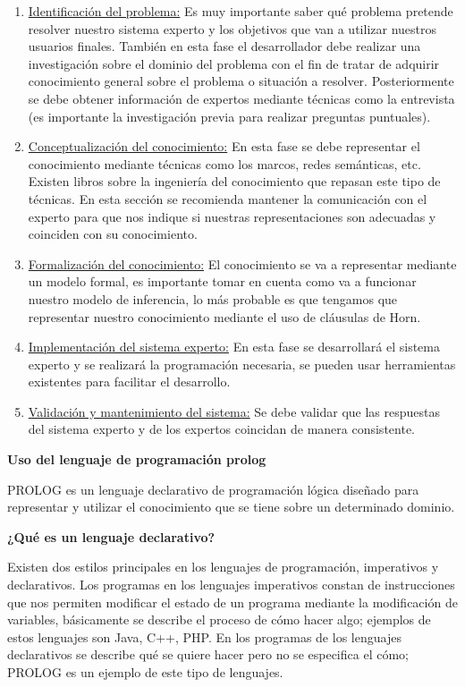 \documentclass[11pt,fleqn]{book} %
\begin{document}
\begin{enumerate}
\item \underline{Identificación del problema:} Es muy importante saber qué problema pretende resolver nuestro sistema experto y los objetivos que van a utilizar nuestros usuarios finales. También en esta fase el desarrollador debe realizar una investigación sobre el dominio del problema con el fin de tratar de adquirir conocimiento general sobre el problema o situación a resolver. Posteriormente se debe obtener información de expertos mediante técnicas como la entrevista (es importante la investigación previa para realizar preguntas puntuales).
\item \underline{Conceptualización del conocimiento:} En esta fase se debe representar el conocimiento mediante técnicas como los marcos, redes semánticas, etc. Existen libros sobre la ingeniería del conocimiento que repasan este tipo de técnicas. En esta sección se recomienda mantener la comunicación con el experto para que nos indique si nuestras representaciones son adecuadas y coinciden con su conocimiento.
\item \underline{Formalización del conocimiento:} El conocimiento se va a representar mediante un modelo formal, es importante tomar en cuenta como va a funcionar nuestro modelo de inferencia, lo más probable es que tengamos que representar nuestro conocimiento mediante el uso de cláusulas de Horn.
\item \underline{Implementación del sistema experto:} En esta fase se desarrollará el sistema experto y se realizará la programación necesaria, se pueden usar herramientas existentes para facilitar el desarrollo.
\item \underline{Validación y mantenimiento del sistema:} Se debe validar que las respuestas del sistema experto y de los expertos coincidan de manera consistente.
\end{enumerate}

\textbf{Uso del lenguaje de programación prolog}

PROLOG es un lenguaje declarativo de programación lógica diseñado para representar y utilizar el conocimiento que se tiene sobre un determinado dominio.

\textbf{¿Qué es un lenguaje declarativo?}

Existen dos estilos principales en los lenguajes de programación, imperativos y declarativos. Los programas en los lenguajes imperativos constan de instrucciones que nos permiten modificar el estado de un programa mediante la modificación de variables, básicamente se describe el proceso de cómo hacer algo; ejemplos de estos lenguajes son Java, C++, PHP. En los programas de los lenguajes declarativos se describe qué se quiere hacer pero no se especifica el cómo; PROLOG es un ejemplo de este tipo de lenguajes.
\end{document}
